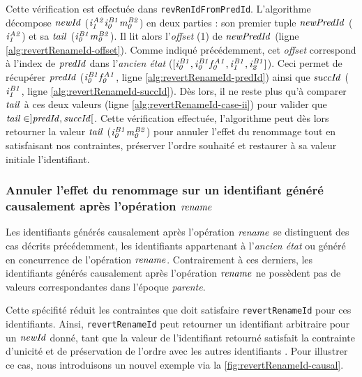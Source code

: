 Cette vérification est effectuée dans \texttt{revRenIdFromPredId}.
L'algorithme décompose $\mathit{newId}$ (\eg $\mathit{i}^{\mathit{A2}}_{\mathit{1}}\mathit{i}^{\mathit{B1}}_{\mathit{0}}\mathit{m}^{\mathit{B2}}_{\mathit{0}}$) en deux parties : son premier tuple $\mathit{newPredId}$ ($\mathit{i}^{\mathit{A2}}_{\mathit{1}}$) et sa $\mathit{tail}$ ($\mathit{i}^{\mathit{B1}}_{\mathit{0}}\mathit{m}^{\mathit{B2}}_{\mathit{0}}$).
Il lit alors l'\emph{offset} (1) de $\mathit{newPredId}$ (ligne \ref{alg:revertRenameId-offset}).
Comme indiqué précédemment, cet \emph{offset} correspond à l'index de $\mathit{predId}$ dans l'\emph{ancien état} ($[\mathit{i}^{\mathit{B1}}_{\mathit{0}},\mathit{i}^{\mathit{B1}}_{\mathit{0}}\mathit{f}^{\mathit{A1}}_{\mathit{0}},\mathit{i}^{\mathit{B1}}_{\mathit{1}},\mathit{i}^{\mathit{B1}}_{\mathit{2}}]$).
Ceci permet de récupérer $\mathit{predId}$ ($\mathit{i}^{\mathit{B1}}_{\mathit{0}}\mathit{f}^{\mathit{A1}}_{\mathit{0}}$, ligne \ref{alg:revertRenameId-predId}) ainsi que $\mathit{succId}$ ($\mathit{i}^{\mathit{B1}}_{\mathit{1}}$, ligne \ref{alg:revertRenameId-succId}).
Dès lors, il ne reste plus qu'à comparer $\mathit{tail}$ à ces deux valeurs (ligne \ref{alg:revertRenameId-case-ii}) pour valider que $\mathit{tail} \in ]\mathit{predId},\mathit{succId}[$.
Cette vérification effectuée, l'algorithme peut dès lors retourner la valeur $\mathit{tail}$ ($\mathit{i}^{\mathit{B1}}_{\mathit{0}}\mathit{m}^{\mathit{B2}}_{\mathit{0}}$) pour annuler l'effet du renommage tout en satisfaisant nos contraintes, \ie préserver l'ordre souhaité et restaurer à sa valeur initiale l'identifiant.

\subsubsection{Annuler l'effet du renommage sur un identifiant généré causalement après l'opération $\mathit{rename}$}

\label{sec:reverting-rename-ops-id-inserted-causally-after}

Les identifiants générés causalement après l'opération $\mathit{rename}$ se distinguent des cas décrits précédemment, \ie les identifiants appartenant à l'\emph{ancien état} ou généré en concurrence de l'opération $\mathit{rename}$.
Contrairement à ces derniers, les identifiants générés causalement après l'opération $\mathit{rename}$ ne possèdent pas de valeurs correspondantes dans l'époque \emph{parente}.

Cette spécifité réduit les contraintes que doit satisfaire \texttt{revertRenameId} pour ces identifiants.
Ainsi, \texttt{revertRenameId} peut retourner un identifiant arbitraire pour un $\mathit{newId}$ donné, tant que la valeur de l'identifiant retourné satisfait la contrainte d'unicité  et de préservation de l'ordre avec les autres identifiants .
Pour illustrer ce cas, nous introduisons un nouvel exemple via la \autoref{fig:revertRenameId-causal}.

